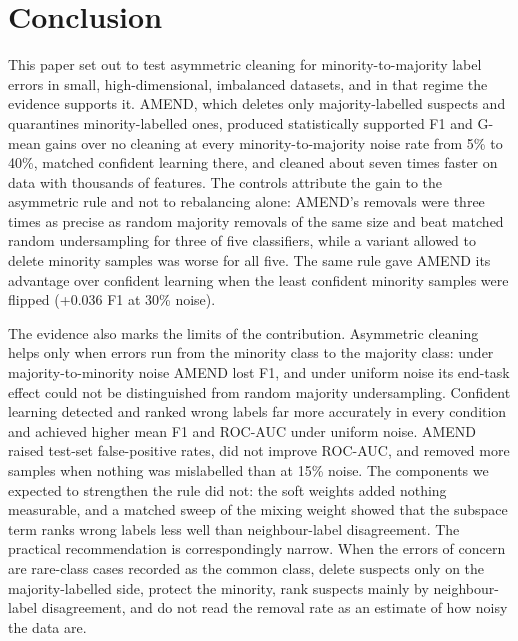 \documentclass[conference]{IEEEtran}
\begin{document}
\section{Conclusion}\label{sec:conclusion}

This paper set out to test asymmetric cleaning for minority-to-majority label errors in small, high-dimensional, imbalanced datasets, and in that regime the evidence supports it. AMEND, which deletes only majority-labelled suspects and quarantines minority-labelled ones, produced statistically supported F1 and G-mean gains over no cleaning at every minority-to-majority noise rate from 5\% to 40\%, matched confident learning there, and cleaned about seven times faster on data with thousands of features. The controls attribute the gain to the asymmetric rule and not to rebalancing alone: AMEND's removals were three times as precise as random majority removals of the same size and beat matched random undersampling for three of five classifiers, while a variant allowed to delete minority samples was worse for all five. The same rule gave AMEND its advantage over confident learning when the least confident minority samples were flipped (+0.036 F1 at 30\% noise).

The evidence also marks the limits of the contribution. Asymmetric cleaning helps only when errors run from the minority class to the majority class: under majority-to-minority noise AMEND lost F1, and under uniform noise its end-task effect could not be distinguished from random majority undersampling. Confident learning detected and ranked wrong labels far more accurately in every condition and achieved higher mean F1 and ROC-AUC under uniform noise. AMEND raised test-set false-positive rates, did not improve ROC-AUC, and removed more samples when nothing was mislabelled than at 15\% noise. The components we expected to strengthen the rule did not: the soft weights added nothing measurable, and a matched sweep of the mixing weight showed that the subspace term ranks wrong labels less well than neighbour-label disagreement. The practical recommendation is correspondingly narrow. When the errors of concern are rare-class cases recorded as the common class, delete suspects only on the majority-labelled side, protect the minority, rank suspects mainly by neighbour-label disagreement, and do not read the removal rate as an estimate of how noisy the data are.



\end{document}
